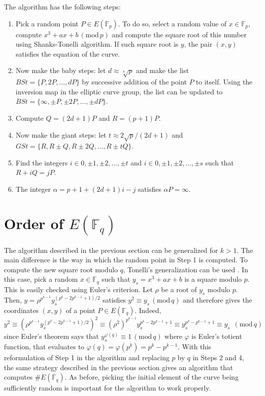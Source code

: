 \documentclass[letter,11pt,reqno]{article}
\theoremstyle{definition}
\theoremstyle{definition}
\theoremstyle{definition}
\theoremstyle{remark}
\theoremstyle{definition}
\theoremstyle{definition}
\newcommand{\Fp}{\mathbb{F}_p}
\newcommand{\Fq}{\mathbb{F}_q}
\newcommand{\modp}{\,(\text{mod}\, p)}
\newcommand{\modq}{\,(\text{mod}\, q)}
\begin{document}
\noindent The algorithm has the following steps:
\begin{enumerate}
    \item Pick a random point $P\in E(\Fp)$. To do so, select a random value of $x\in\Fp$, compute $x^3+ax+b \modp$ and compute the square root of this number using Shanks-Tonelli algorithm. If such square root is $y$, the pair $(x,y)$ satisfies the equation of the curve. 
    \item Now make the baby steps: let $d \approx \sqrt[4]{p}$ and make the list $BSt = \{ P,2P,\ldots,dP \}$ by successive addition of the point $P$ to itself. Using the inversion map in the elliptic curve group, the list can be updated to $BSt = \{ \infty,\pm P,\pm 2P,\ldots,\pm dP \}$. 
    \item Compute $Q = (2d+1)P$ and $R = (p+1)P$.
    \item Now make the giant steps: let $t \approx 2\sqrt{p}/(2d+1)$ and $GSt = \{ R,R\pm Q, R\pm 2Q, \ldots,R\pm tQ \}$. 
    \item Find the integers $i\in{0,\pm1,\pm2,\ldots,\pm t}$ and $i\in{0,\pm1,\pm2,\ldots,\pm s}$ such that $R+iQ = jP$. 
    \item The integer $\alpha = p+1+(2d+1)i-j$ satisfies $\alpha P = \infty$. 
\end{enumerate}

\section{Order of $E(\Fq)$}

The algorithm described in the previous section can be generalized for $k>1$. The main difference is the way in which the random point in Step 1 is computed. To compute the new square root modulo $q$, Tonelli's generalization can be used \cite{tonelli1891}. In this case, pick a random $x\in\Fq$ such that $y_s = x^3+ax+b$ is a square modulo $p$. This is easily checked using Euler's criterion. Let $\rho$ be a root of $y_s$ modulo $p$. Then, $y = \rho^{p^{k-1}}y_s^{(p^k-2p^{k-1}+1)/2}$ satisfies $y^2 \equiv y_s \modq$ and therefore gives the coordinates $(x,y)$ of a point $P\in E(\Fq)$. Indeed, $$y^2 \equiv \left( \rho^{p^{k-1}}y_s^{(p^k-2p^{k-1}+1)/2} \right)^2 \equiv (\rho^2)^{p^{k-1}}y_s^{p^k-2p^{k-1}+1} \equiv y_s^{p^{k}-p^{k-1}+1} \equiv y_s \;\modq$$ since Euler's theorem says that $y_s^{\varphi(q)} \equiv 1 \modq$ where $\varphi$ is Euler's totient function, that evaluates to $\varphi(q) = \varphi(p^k) = p^k-p^{k-1}.$ With this reformulation of Step 1 in the algorithm and replacing $p$ by $q$ in Steps 2 and 4, the same strategy described in the previous section gives an algorithm that computes $\# E(\Fq)$. As before, picking the initial element of the curve being sufficiently random is important for the algorithm to work properly.
\end{document}
